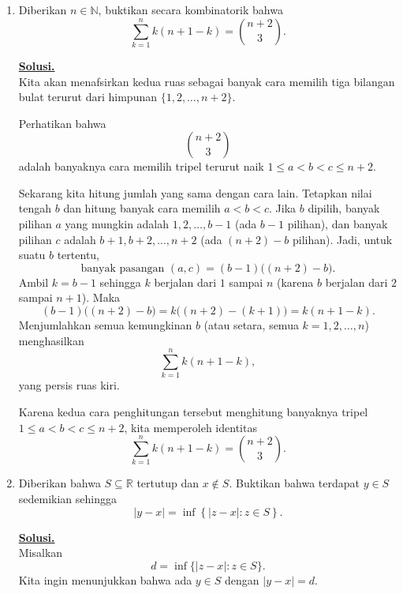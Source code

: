 \documentclass[12pt,twoside]{article}
\newenvironment{solution}
{
	\par\noindent\textbf{\underline{Solusi.}}\\
}
{
	\par
}
\begin{document}
\begin{enumerate}
\begin{enumerate}
\begin{solution}
                  Akibatnya, dengan Teorema Cauchy,
                  \[
                    \int_\gamma f(z)\,dz=0.
                  \]
                  Dalam kasus khusus ketika memang tidak ada kutub di dalam $|z|<1$ (misal $|\alpha|$ cukup besar sehingga $\cos z=-\alpha$ tidak punya solusi di $|z|<1$), integral selalu nol. Pemeriksaan ketaksamaan di atas memastikan bahwa penyebut tidak pernah nol di daerah itu.
                \end{solution}
        \end{enumerate}

  \item Diberikan $n\in \mathbb{N}$, buktikan secara kombinatorik bahwa
        $$\sum_{k=1}^{n}k\left(n+1-k\right)=\binom{n+2}{3}.$$
        \begin{solution}
          Kita akan menafsirkan kedua ruas sebagai banyak cara memilih tiga bilangan bulat terurut dari himpunan $\{1,2,\dots,n+2\}$.

          Perhatikan bahwa
          \[
            \binom{n+2}{3}
          \]
          adalah banyaknya cara memilih tripel terurut naik $1\le a<b<c\le n+2$.

          Sekarang kita hitung jumlah yang sama dengan cara lain. Tetapkan nilai tengah $b$ dan hitung banyak cara memilih $a<b<c$. Jika $b$ dipilih, banyak pilihan $a$ yang mungkin adalah $1,2,\dots,b-1$ (ada $b-1$ pilihan), dan banyak pilihan $c$ adalah $b+1,b+2,\dots,n+2$ (ada $(n+2)-b$ pilihan). Jadi, untuk suatu $b$ tertentu,
          \[
            \text{banyak pasangan }(a,c)= (b-1)\bigl((n+2)-b\bigr).
          \]
          Ambil $k=b-1$ sehingga $k$ berjalan dari $1$ sampai $n$ (karena $b$ berjalan dari $2$ sampai $n+1$). Maka
          \[
            (b-1)\bigl((n+2)-b\bigr)=k\bigl((n+2)-(k+1)\bigr)=k(n+1-k).
          \]
          Menjumlahkan semua kemungkinan $b$ (atau setara, semua $k=1,2,\dots,n$) menghasilkan
          \[
            \sum_{k=1}^nk(n+1-k),
          \]
          yang persis ruas kiri.

          Karena kedua cara penghitungan tersebut menghitung banyaknya tripel $1\le a<b<c\le n+2$, kita memperoleh identitas
          \[
            \sum_{k=1}^{n}k\left(n+1-k\right)=\binom{n+2}{3}.
          \]
        \end{solution}

  \item Diberikan bahwa $S\subseteq \mathbb{R}$ tertutup dan $x\notin S$. Buktikan bahwa terdapat $y\in S$ sedemikian sehingga
        $$|y-x|=\inf\left\{|z-x|:z\in S\right\}.$$
        \begin{solution}
          Misalkan
          \[
            d=\inf\{|z-x|:z\in S\}.
          \]
          Kita ingin menunjukkan bahwa ada $y\in S$ dengan $|y-x|=d$.


\end{solution}
\end{enumerate}
\end{document}

